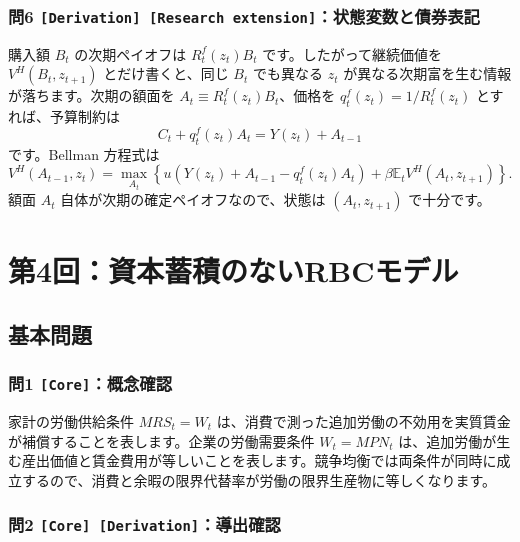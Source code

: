 \documentclass[
  japanese,
  lualatex,
  ja=standard,
  11pt,
  a4paper]{ltjsarticle}
\begin{document}
\subsubsection{\texorpdfstring{問6
\texttt{{[}Derivation{]}\ {[}Research\ extension{]}}：状態変数と債券表記}{問6 {[}Derivation{]} {[}Research extension{]}：状態変数と債券表記}}\label{ux554f6-derivation-research-extensionux72b6ux614bux5909ux6570ux3068ux50b5ux5238ux8868ux8a18}

購入額 \(B_t\) の次期ペイオフは \(R_t^f(z_t)B_t\)
です。したがって継続価値を \(V^H(B_t,z_{t+1})\) とだけ書くと、同じ
\(B_t\) でも異なる \(z_t\)
が異なる次期富を生む情報が落ちます。次期の額面を
\(A_t\equiv R_t^f(z_t)B_t\)、価格を \(q_t^f(z_t)=1/R_t^f(z_t)\)
とすれば、予算制約は \[
C_t+q_t^f(z_t)A_t=Y(z_t)+A_{t-1}
\] です。Bellman 方程式は \[
V^H(A_{t-1},z_t)
=\max_{A_t}
\left\{
u\!\left(Y(z_t)+A_{t-1}-q_t^f(z_t)A_t\right)
+\beta\mathbb E_tV^H(A_t,z_{t+1})
\right\}.
\] 額面 \(A_t\) 自体が次期の確定ペイオフなので、状態は \((A_t,z_{t+1})\)
で十分です。

\clearpage

\section{第4回：資本蓄積のないRBCモデル}\label{ux7b2c4ux56deux8cc7ux672cux84c4ux7a4dux306eux306aux3044rbcux30e2ux30c7ux30eb}

\subsection{基本問題}\label{ux57faux672cux554fux984c-3}

\subsubsection{\texorpdfstring{問1
\texttt{{[}Core{]}}：概念確認}{問1 {[}Core{]}：概念確認}}\label{ux554f1-coreux6982ux5ff5ux78baux8a8d}

家計の労働供給条件 \(MRS_t=W_t\)
は、消費で測った追加労働の不効用を実質賃金が補償することを表します。企業の労働需要条件
\(W_t=MPN_t\)
は、追加労働が生む産出価値と賃金費用が等しいことを表します。競争均衡では両条件が同時に成立するので、消費と余暇の限界代替率が労働の限界生産物に等しくなります。

\subsubsection{\texorpdfstring{問2
\texttt{{[}Core{]}\ {[}Derivation{]}}：導出確認}{問2 {[}Core{]} {[}Derivation{]}：導出確認}}\label{ux554f2-core-derivationux5c0eux51faux78baux8a8d}
\end{document}
